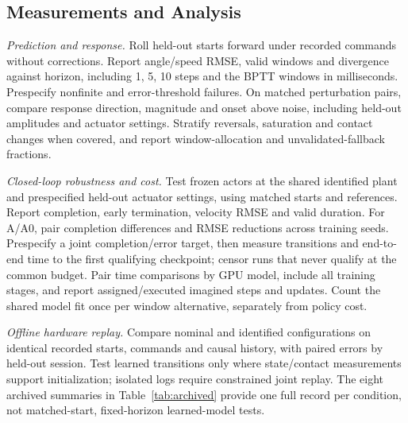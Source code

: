 \documentclass[letterpaper,10pt,conference]{ieeeconf}
\begin{document}
\subsection{Measurements and Analysis}
\emph{Prediction and response.} Roll held-out starts forward under recorded commands without corrections. Report angle/speed RMSE, valid windows and divergence against horizon, including 1, 5, 10 steps and the BPTT windows in milliseconds. Prespecify nonfinite and error-threshold failures. On matched perturbation pairs, compare response direction, magnitude and onset above noise, including held-out amplitudes and actuator settings. Stratify reversals, saturation and contact changes when covered, and report window-allocation and unvalidated-fallback fractions.

\emph{Closed-loop robustness and cost.} Test frozen actors at the shared identified plant and prespecified held-out actuator settings, using matched starts and references. Report completion, early termination, velocity RMSE and valid duration. For A/A0, pair completion differences and RMSE reductions across training seeds. Prespecify a joint completion/error target, then measure transitions and end-to-end time to the first qualifying checkpoint; censor runs that never qualify at the common budget. Pair time comparisons by GPU model, include all training stages, and report assigned/executed imagined steps and updates. Count the shared model fit once per window alternative, separately from policy cost.

\emph{Offline hardware replay.} Compare nominal and identified configurations on identical recorded starts, commands and causal history, with paired errors by held-out session. Test learned transitions only where state/contact measurements support initialization; isolated logs require constrained joint replay. The eight archived summaries in Table~\ref{tab:archived} provide one full record per condition, not matched-start, fixed-horizon learned-model tests.
\end{document}
